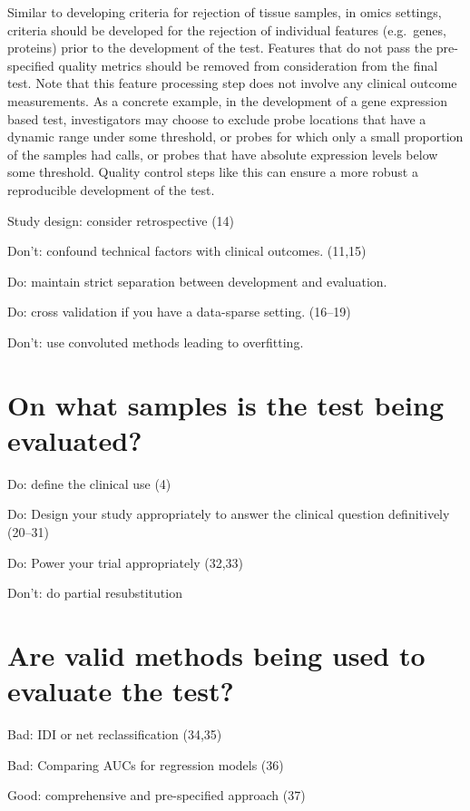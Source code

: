 \documentclass[11pt]{article}
\begin{document}
Similar to developing criteria for rejection of tissue samples, in omics
settings, criteria should be developed for the rejection of individual
features (e.g.~genes, proteins) prior to the development of the test.
Features that do not pass the pre-specified quality metrics should be
removed from consideration from the final test. Note that this feature
processing step does not involve any clinical outcome measurements. As a
concrete example, in the development of a gene expression based test,
investigators may choose to exclude probe locations that have a dynamic
range under some threshold, or probes for which only a small proportion
of the samples had calls, or probes that have absolute expression levels
below some threshold. Quality control steps like this can ensure a more
robust a reproducible development of the test.

Study design: consider retrospective (14)

Don't: confound technical factors with clinical outcomes. (11,15)

Do: maintain strict separation between development and evaluation.

Do: cross validation if you have a data-sparse setting. (16--19)

Don't: use convoluted methods leading to overfitting.

\section{On what samples is the test being
evaluated?}\label{on-what-samples-is-the-test-being-evaluated}

Do: define the clinical use (4)

Do: Design your study appropriately to answer the clinical question
definitively (20--31)

Do: Power your trial appropriately (32,33)

Don't: do partial resubstitution

\section{Are valid methods being used to evaluate the
test?}\label{are-valid-methods-being-used-to-evaluate-the-test}

Bad: IDI or net reclassification (34,35)

Bad: Comparing AUCs for regression models (36)

Good: comprehensive and pre-specified approach (37)
\end{document}
